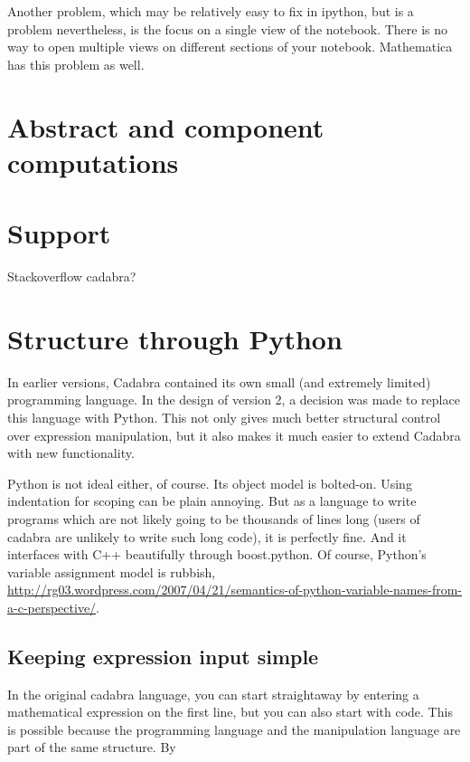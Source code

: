 \documentclass[11pt]{article}
\begin{document}
Another problem, which may be relatively easy to fix in ipython, but
is a problem nevertheless, is the focus on a single view of the
notebook. There is no way to open multiple views on different sections
of your notebook. Mathematica has this problem as well.


\section{Abstract and component computations}


\section{Support}

Stackoverflow cadabra?

\section{Structure through Python}

In earlier versions, Cadabra contained its own small (and extremely
limited) programming language. In the design of version 2, a decision
was made to replace this language with Python. This not only gives
much better structural control over expression manipulation, but it
also makes it much easier to extend Cadabra with new functionality.

Python is not ideal either, of course. Its object model is bolted-on.
Using indentation for scoping can be plain annoying.  But as a
language to write programs which are not likely going to be thousands
of lines long (users of cadabra are unlikely to write such long code),
it is perfectly fine. And it interfaces with C++ beautifully through
boost.python. Of course, Python's variable assignment model is rubbish,
\url{http://rg03.wordpress.com/2007/04/21/semantics-of-python-variable-names-from-a-c-perspective/}.

\subsection{Keeping expression input simple}

In the original cadabra language, you can start straightaway by
entering a mathematical expression on the first line, but you can also
start with code.  This is possible because the programming language
and the manipulation language are part of the same structure. By
\end{document}
